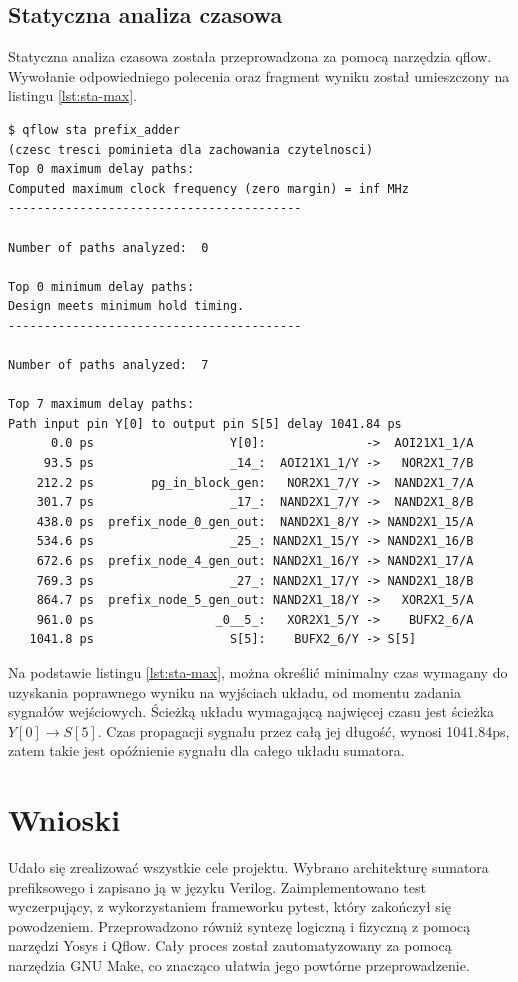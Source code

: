 \documentclass[12pt,oneside,reqno]{article}
\begin{document}
\clearpage
\subsection{Statyczna analiza czasowa}
Statyczna analiza czasowa została przeprowadzona za pomocą narzędzia qflow. Wywołanie odpowiedniego polecenia oraz fragment wyniku został umieszczony na listingu \ref{lst:sta-max}.

\begin{lstlisting}[caption={Wywołanie oraz fragment wyniku statycznej analizy czasowej.}, label={lst:sta-max}]
$ qflow sta prefix_adder
(czesc tresci pominieta dla zachowania czytelnosci)
Top 0 maximum delay paths:
Computed maximum clock frequency (zero margin) = inf MHz
-----------------------------------------

Number of paths analyzed:  0

Top 0 minimum delay paths:
Design meets minimum hold timing.
-----------------------------------------

Number of paths analyzed:  7

Top 7 maximum delay paths:
Path input pin Y[0] to output pin S[5] delay 1041.84 ps
      0.0 ps                   Y[0]:              ->  AOI21X1_1/A
     93.5 ps                   _14_:  AOI21X1_1/Y ->   NOR2X1_7/B
    212.2 ps        pg_in_block_gen:   NOR2X1_7/Y ->  NAND2X1_7/A
    301.7 ps                   _17_:  NAND2X1_7/Y ->  NAND2X1_8/B
    438.0 ps  prefix_node_0_gen_out:  NAND2X1_8/Y -> NAND2X1_15/A
    534.6 ps                   _25_: NAND2X1_15/Y -> NAND2X1_16/B
    672.6 ps  prefix_node_4_gen_out: NAND2X1_16/Y -> NAND2X1_17/A
    769.3 ps                   _27_: NAND2X1_17/Y -> NAND2X1_18/B
    864.7 ps  prefix_node_5_gen_out: NAND2X1_18/Y ->   XOR2X1_5/A
    961.0 ps                 _0__5_:   XOR2X1_5/Y ->    BUFX2_6/A
   1041.8 ps                   S[5]:    BUFX2_6/Y -> S[5]
\end{lstlisting}

Na podstawie listingu \ref{lst:sta-max}, można określić minimalny czas wymagany do uzyskania poprawnego wyniku na wyjściach układu, od momentu zadania sygnałów wejściowych. Ścieżką układu wymagającą najwięcej czasu jest ścieżka $Y[0] \rightarrow S[5]$. Czas propagacji sygnału przez całą jej długość, wynosi 1041.84ps, zatem takie jest opóźnienie sygnału dla całego układu sumatora.


\section{Wnioski}
Udało się zrealizować wszystkie cele projektu. Wybrano architekturę sumatora prefiksowego i zapisano ją w języku Verilog. Zaimplementowano test wyczerpujący, z wykorzystaniem frameworku pytest, który zakończył się powodzeniem. Przeprowadzono równiż syntezę logiczną i fizyczną z pomocą narzędzi Yosys i Qflow. Cały proces został zautomatyzowany za pomocą narzędzia GNU Make, co znacząco ułatwia jego powtórne przeprowadzenie.
\end{document}

